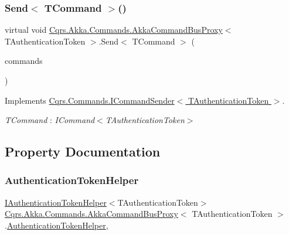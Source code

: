 \subsubsection{\texorpdfstring{Send$<$ T\+Command $>$()}{Send< TCommand >()}\hspace{0.1cm}{\footnotesize\ttfamily [2/2]}}
{\footnotesize\ttfamily virtual void \hyperlink{classCqrs_1_1Akka_1_1Commands_1_1AkkaCommandBusProxy}{Cqrs.\+Akka.\+Commands.\+Akka\+Command\+Bus\+Proxy}$<$ T\+Authentication\+Token $>$.Send$<$ T\+Command $>$ (\begin{DoxyParamCaption}\item[{I\+Enumerable$<$ T\+Command $>$}]{commands }\end{DoxyParamCaption})\hspace{0.3cm}{\ttfamily [virtual]}}



Implements \hyperlink{interfaceCqrs_1_1Commands_1_1ICommandSender_a3fb3ec40a3e862f721a7c9204e67e832}{Cqrs.\+Commands.\+I\+Command\+Sender$<$ T\+Authentication\+Token $>$}.

\begin{Desc}
\item[Type Constraints]\begin{description}
\item[{\em T\+Command} : {\em I\+Command$<$T\+Authentication\+Token$>$}]\end{description}
\end{Desc}


\subsection{Property Documentation}
\mbox{\label{classCqrs_1_1Akka_1_1Commands_1_1AkkaCommandBusProxy_a6faae6227f1da33928e54a775466f9c9}} 
\subsubsection{\texorpdfstring{Authentication\+Token\+Helper}{AuthenticationTokenHelper}}
{\footnotesize\ttfamily \hyperlink{interfaceCqrs_1_1Authentication_1_1IAuthenticationTokenHelper}{I\+Authentication\+Token\+Helper}$<$T\+Authentication\+Token$>$ \hyperlink{classCqrs_1_1Akka_1_1Commands_1_1AkkaCommandBusProxy}{Cqrs.\+Akka.\+Commands.\+Akka\+Command\+Bus\+Proxy}$<$ T\+Authentication\+Token $>$.\hyperlink{classCqrs_1_1Authentication_1_1AuthenticationTokenHelper}{Authentication\+Token\+Helper}\hspace{0.3cm}{\ttfamily [get]}, {\ttfamily [protected]}}

